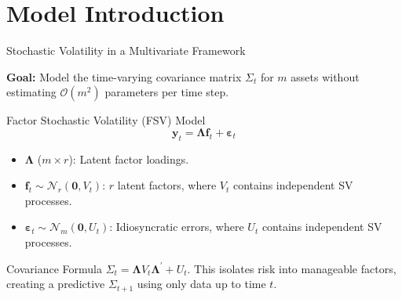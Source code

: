 \documentclass[10pt]{beamer}\usepackage[]{graphicx}\usepackage[table]{xcolor}
\begin{document}
\section{Model Introduction}
\begin{frame}{Stochastic Volatility in a Multivariate Framework}

  \textbf{Goal:} Model the time-varying covariance matrix $\Sigma_t$ for $m$ assets without estimating $\mathcal{O}(m^2)$ parameters per time step.

  \vspace{0.4em}
  
  \begin{alertblock}{Factor Stochastic Volatility (FSV) Model}
    \[
      \mathbf{y}_t = \boldsymbol{\Lambda} \mathbf{f}_t + \boldsymbol{\varepsilon}_t
    \]
  \end{alertblock}

  \begin{itemize}
    \setlength\itemsep{0.5em}
    \item $\boldsymbol{\Lambda}$ ($m \times r$): Latent factor loadings.
    \item $\mathbf{f}_t \sim \mathcal{N}_r(\mathbf{0}, V_t)$: $r$ latent factors, where $V_t$ contains independent SV processes.
    \item $\boldsymbol{\varepsilon}_t \sim \mathcal{N}_m(\mathbf{0}, U_t)$: Idiosyncratic errors, where $U_t$ contains independent SV processes.
  \end{itemize}

  \vspace{0.2em}
  \begin{block}{Covariance Formula}
    $\Sigma_t = \boldsymbol{\Lambda} V_t \boldsymbol{\Lambda}^\prime + U_t$. This isolates risk into manageable factors, creating a predictive $\Sigma_{t+1}$ using only data up to time $t$.
  \end{block}

\end{frame}
\end{document}

